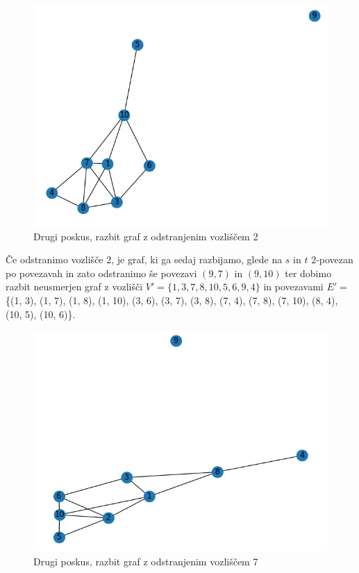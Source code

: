 \documentclass[a4paper,12pt]{article}
\theoremstyle{definition}
\begin{document}
\begin{figure}[H]
	\caption{Drugi poskus, razbit graf z odstranjenim vozliščem 2}
	\centering
	\includegraphics[scale=0.4]{slikovni_prikaz/Figure_2_1}
\end{figure}

Če odstranimo vozlišče $2$, je graf, ki ga sedaj razbijamo, glede na $s$ in $t$ 
$2$-povezan po povezavah in zato odstranimo še povezavi $(9, 7)$ in $(9, 10)$
ter dobimo razbit neusmerjen graf z vozlišči $V' = \{1, 3, 7, 8, 10, 5, 6, 9, 4\}$ in povezavami 
$E' =$ \{(1, 3), (1, 7), (1, 8), (1, 10), (3, 6), (3, 7), (3, 8), (7, 4), (7, 8), (7, 10), (8, 4), (10, 5), (10, 6)\}.\\

\begin{figure}[H]
	\caption{Drugi poskus, razbit graf z odstranjenim vozliščem 7}
	\centering
	\includegraphics[scale=0.4]{slikovni_prikaz/Figure_2_2}
\end{figure}
\end{document}

